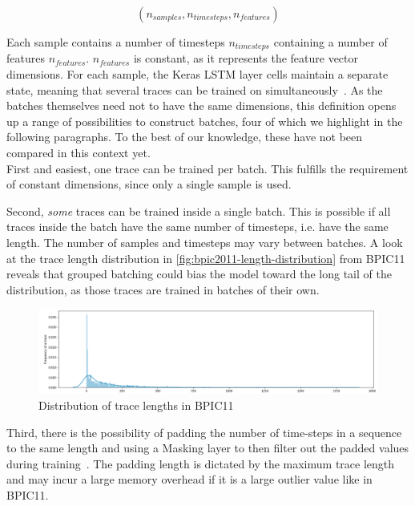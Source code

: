 $$(n_{samples}, n_{timesteps}, n_{features})$$

Each sample contains a number of timesteps $n_{timesteps}$ containing a number of features $n_{features}$. $n_{features}$ is constant, as it represents the feature vector dimensions. For each sample, the Keras LSTM layer cells maintain a separate state, meaning that several traces can be trained on simultaneously~\cite{web:keras-lstm-state}. As the batches themselves need not to have the same dimensions, this definition opens up a range of possibilities to construct batches, four of which we highlight in the following paragraphs. To the best of our knowledge, these have not been compared in this context yet.\\

First and easiest, one trace can be trained per batch. This fulfills the requirement of constant dimensions, since only a single sample is used.

Second, \textit{some} traces can be trained inside a single batch. This is possible if all traces inside the batch have the same number of timesteps, i.e. have the same length. The number of samples and timesteps may vary between batches. A look at the trace length distribution in \autoref{fig:bpic2011-length-distribution} from BPIC11 reveals that grouped batching could bias the model toward the long tail of the distribution, as those traces are trained in batches of their own.

\begin{figure}[ht!]
    \centering
    \includegraphics[width=.9\textwidth]{gfx/frequency-distribution.png}
    \caption{Distribution of trace lengths in BPIC11}
    \label{fig:bpic2011-length-distribution}
\end{figure}

Third, there is the possibility of padding the number of time-steps in a sequence to the same length and using a Masking layer to then filter out the padded values during training~\cite{web:keras}. The padding length is dictated by the maximum trace length and may incur a large memory overhead if it is a large outlier value like in BPIC11.

